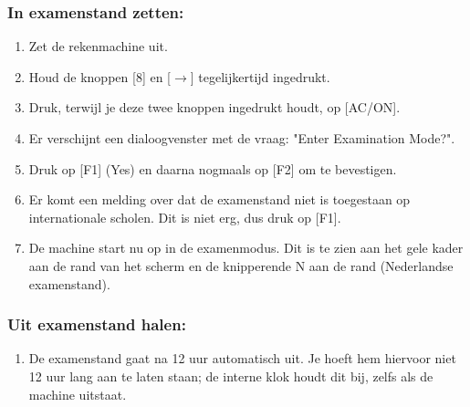 \documentclass{article}
\begin{document}
    \subsubsection*{In examenstand zetten:}
    \begin{enumerate}
        \item Zet de rekenmachine uit.
        \item Houd de knoppen [8] en [$\rightarrow$] tegelijkertijd ingedrukt.
        \item Druk, terwijl je deze twee knoppen ingedrukt houdt, op [AC/ON].
        \item Er verschijnt een dialoogvenster met de vraag: "Enter Examination Mode?".
        \item Druk op [F1] (Yes) en daarna nogmaals op [F2] om te bevestigen.
        \item Er komt een melding over dat de examenstand niet is toegestaan op internationale scholen. Dit is niet erg, dus druk op [F1].
        \item De machine start nu op in de examenmodus. Dit is te zien aan het gele kader aan de rand van het scherm en de knipperende N aan de rand (Nederlandse examenstand).
    \end{enumerate}

    \subsubsection*{Uit examenstand halen:}
    \begin{enumerate}
        \item De examenstand gaat na 12 uur automatisch uit. Je hoeft hem hiervoor niet 12 uur lang aan te laten staan; de interne klok houdt dit bij, zelfs als de machine uitstaat.
    \end{enumerate}
\end{document}
